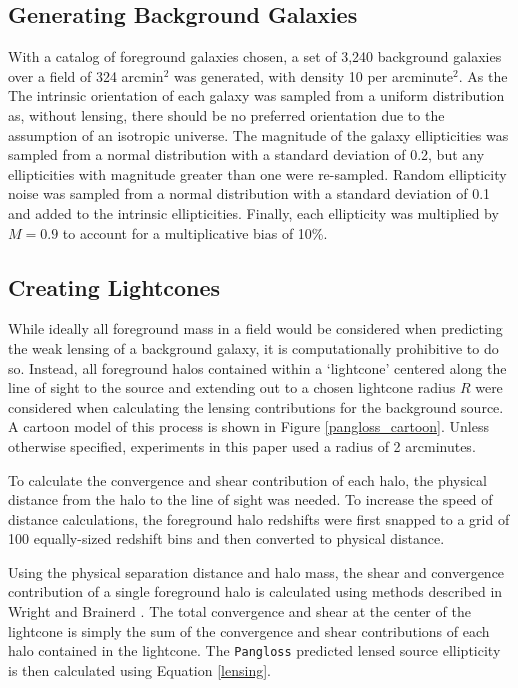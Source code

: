 \documentclass[%
 reprint,
 amsmath,amssymb,
 aps,nofootinbib
]{revtex4-1}
\begin{document}
\subsection*{Generating Background Galaxies}
With a catalog of foreground galaxies chosen, a set of 3,240 background galaxies over a field of 324 arcmin$^2$ was generated, with density 10 per arcminute$^2$. As the The intrinsic orientation of each galaxy was sampled from a uniform distribution as, without lensing, there should be no preferred orientation due to the assumption of an isotropic universe. The magnitude of the galaxy ellipticities was sampled from a normal distribution with a standard deviation of 0.2, but any ellipticities with magnitude greater than one were re-sampled. Random ellipticity noise was sampled from a normal distribution with a standard deviation of 0.1 and added to the intrinsic ellipticities. Finally, each ellipticity was multiplied by $M=0.9$ to account for a multiplicative bias of 10\%.

\subsection*{Creating Lightcones}

While ideally all foreground mass in a field would be considered when predicting the weak lensing of a background galaxy, it is computationally prohibitive to do so. Instead, all foreground halos contained within a `lightcone' centered along the line of sight to the source and extending out to a chosen lightcone radius $R$ were considered when calculating the lensing contributions for the background source. A cartoon model of this process is shown in Figure \ref{pangloss_cartoon}. Unless otherwise specified, experiments in this paper used a radius of 2 arcminutes.

To calculate the convergence and shear contribution of each halo, the physical distance from the halo to the line of sight was needed. To increase the speed of distance calculations, the foreground halo redshifts were first snapped to a grid of 100 equally-sized redshift bins and then converted to physical distance.

Using the physical separation distance and halo mass, the shear and convergence contribution of a single foreground halo is calculated using methods described in Wright and Brainerd \cite{lensing_calc}. The total convergence and shear at the center of the lightcone is simply the sum of the convergence and shear contributions of each halo contained in the lightcone. The \texttt{Pangloss} predicted lensed source ellipticity is then calculated using Equation \eqref{lensing}.
\end{document}
